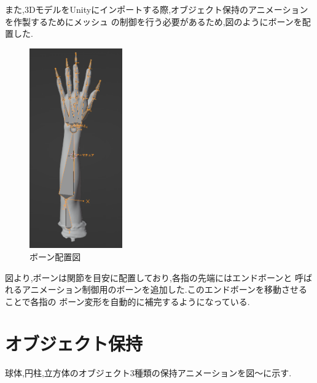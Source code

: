 \documentclass{ltjsreport}
\begin{document}
		また,3DモデルをUnityにインポートする際,オブジェクト保持のアニメーションを作製するためにメッシュ
		の制御を行う必要があるため,図のようにボーンを配置した.
		\begin{figure}[H]
		\centering
		\includegraphics[width = 4cm]{../figs/meshbone.png}
		\caption{ボーン配置図}
		\label{fig:meshbone}
		\end{figure}

		図より,ボーンは関節を目安に配置しており,各指の先端にはエンドボーンと
		呼ばれるアニメーション制御用のボーンを追加した.このエンドボーンを移動させることで各指の
		ボーン変形を自動的に補完するようになっている.

	\section{オブジェクト保持}
		球体,円柱,立方体のオブジェクト3種類の保持アニメーションを図〜に示す.
\end{document}
